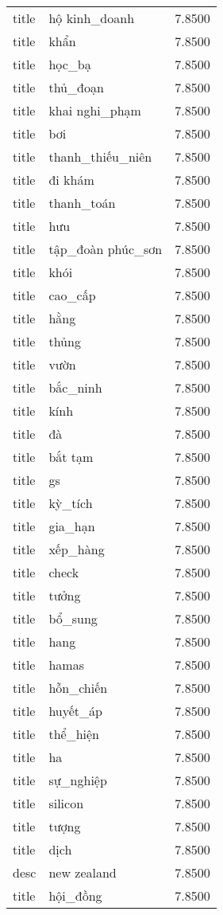 \documentclass{article}
\begin{document}
\begin{tabular}{lll}
title & hộ kinh\_doanh & 7.8500\\
title & khẩn & 7.8500\\
title & học\_bạ & 7.8500\\
title & thủ\_đoạn & 7.8500\\
title & khai nghi\_phạm & 7.8500\\
title & bơi & 7.8500\\
title & thanh\_thiếu\_niên & 7.8500\\
title & đi khám & 7.8500\\
title & thanh\_toán & 7.8500\\
title & hưu & 7.8500\\
title & tập\_đoàn phúc\_sơn & 7.8500\\
title & khói & 7.8500\\
title & cao\_cấp & 7.8500\\
title & hằng & 7.8500\\
title & thủng & 7.8500\\
title & vườn & 7.8500\\
title & bắc\_ninh & 7.8500\\
title & kính & 7.8500\\
title & đà & 7.8500\\
title & bắt tạm & 7.8500\\
title & gs & 7.8500\\
title & kỳ\_tích & 7.8500\\
title & gia\_hạn & 7.8500\\
title & xếp\_hàng & 7.8500\\
title & check & 7.8500\\
title & tưởng & 7.8500\\
title & bổ\_sung & 7.8500\\
title & hang & 7.8500\\
title & hamas & 7.8500\\
title & hỗn\_chiến & 7.8500\\
title & huyết\_áp & 7.8500\\
title & thể\_hiện & 7.8500\\
title & ha & 7.8500\\
title & sự\_nghiệp & 7.8500\\
title & silicon & 7.8500\\
title & tượng & 7.8500\\
title & dịch & 7.8500\\
desc & new zealand & 7.8500\\
title & hội\_đồng & 7.8500\\

\end{tabular}
\end{document}
